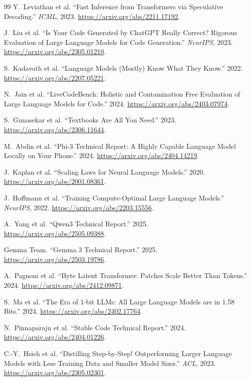 \documentclass[10pt,letterpaper]{article}
\newcommand{\1}{\mathbb{1}}
\begin{document}
\begin{thebibliography}{99}
Y.~Leviathan et al. ``Fast Inference from Transformers via Speculative Decoding.''
\emph{ICML}, 2023. \url{https://arxiv.org/abs/2211.17192}.

J.~Liu et al. ``Is Your Code Generated by ChatGPT Really Correct? Rigorous Evaluation of Large
Language Models for Code Generation.'' \emph{NeurIPS}, 2023.
\url{https://arxiv.org/abs/2305.01210}.

S.~Kadavath et al. ``Language Models (Mostly) Know What They Know.'' 2022.
\url{https://arxiv.org/abs/2207.05221}.

N.~Jain et al. ``LiveCodeBench: Holistic and Contamination Free Evaluation of Large Language Models
for Code.'' 2024. \url{https://arxiv.org/abs/2403.07974}.

S.~Gunasekar et al. ``Textbooks Are All You Need.'' 2023.
\url{https://arxiv.org/abs/2306.11644}.

M.~Abdin et al. ``Phi-3 Technical Report: A Highly Capable Language Model Locally on Your Phone.''
2024. \url{https://arxiv.org/abs/2404.14219}.

J.~Kaplan et al. ``Scaling Laws for Neural Language Models.'' 2020.
\url{https://arxiv.org/abs/2001.08361}.

J.~Hoffmann et al. ``Training Compute-Optimal Large Language Models.'' \emph{NeurIPS}, 2022.
\url{https://arxiv.org/abs/2203.15556}.

A.~Yang et al. ``Qwen3 Technical Report.'' 2025.
\url{https://arxiv.org/abs/2505.09388}.

Gemma Team. ``Gemma 3 Technical Report.'' 2025.
\url{https://arxiv.org/abs/2503.19786}.

A.~Pagnoni et al. ``Byte Latent Transformer: Patches Scale Better Than Tokens.'' 2024.
\url{https://arxiv.org/abs/2412.09871}.

S.~Ma et al. ``The Era of 1-bit LLMs: All Large Language Models are in 1.58 Bits.'' 2024.
\url{https://arxiv.org/abs/2402.17764}.

N.~Pinnaparaju et al. ``Stable Code Technical Report.'' 2024.
\url{https://arxiv.org/abs/2404.01226}.

C.-Y.~Hsieh et al. ``Distilling Step-by-Step! Outperforming Larger Language Models with Less Training
Data and Smaller Model Sizes.'' \emph{ACL}, 2023.
\url{https://arxiv.org/abs/2305.02301}.


\end{thebibliography}
\end{document}
